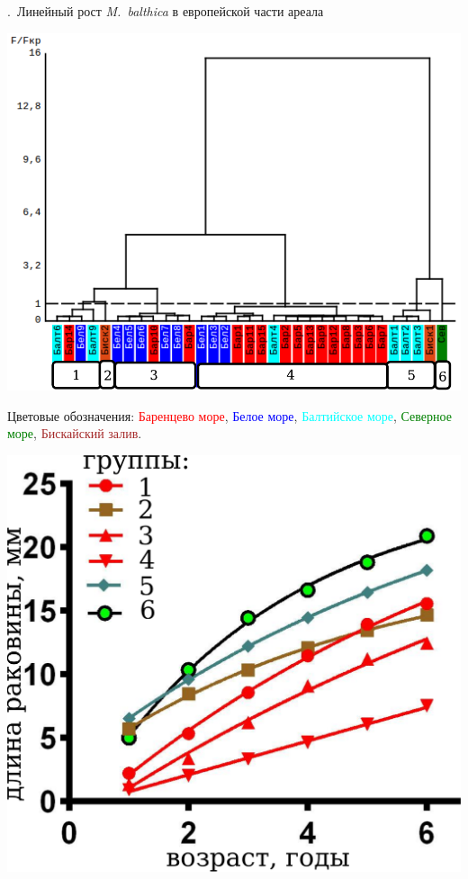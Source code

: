\documentclass[aspectratio=169, xcolor=table]{beamer}
\begin{document}
\begin{frame}{\insertpagenumber.\ Линейный рост {\it M.~balthica} в европейской части ареала}
	\begin{minipage}[t]{.52\linewidth}
		\begin{center}
			\includegraphics[width=\textwidth]{./Europe_clusters_usrednenie.pdf}
		\end{center}

Цветовые обозначения: \textcolor{red}{Баренцево море}, 
\textcolor{blue}{Белое море}, 
\textcolor{cyan}{Балтийское море}, 
\textcolor{green}{Северное море}, 
\textcolor{brown}{Бискайский залив}.
	\end{minipage}
%
	\begin{minipage}[t]{.45\linewidth}
		\begin{center}
			\includegraphics[width=\textwidth]{./Europe_growth_groups_prizm.pdf}
		\end{center}
	\end{minipage}
\end{frame}
\end{document}
